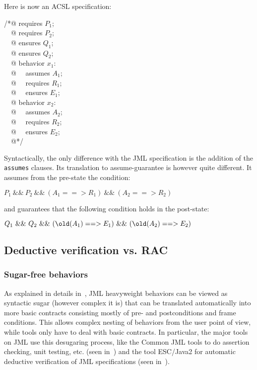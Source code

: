 \noindent
Here is now an ACSL specification:

\begin{flushleft}\ttfamily
/*@ requires $P_1$; \\
~~@ requires $P_2$; \\
~~@ ensures  $Q_1$; \\
~~@ ensures  $Q_2$; \\
~~@ behavior $x_1$: \\
~~@ ~~assumes $A_1$; \\
~~@ ~~requires $R_1$; \\
~~@ ~~ensures $E_1$; \\
~~@ behavior $x_2$: \\
~~@ ~~assumes $A_2$; \\
~~@ ~~requires $R_2$; \\
~~@ ~~ensures $E_2$; \\
~~@*/
\end{flushleft}

\noindent
Syntactically, the only difference with the JML specification is the
addition of the \verb|assumes| clauses.
Its translation to assume-guarantee is however quite different. 
It assumes from the pre-state the condition:

\begin{center}
{\ttfamily $P_1 ~\&\&~ P_2 ~\&\&~ 
  (A_1 ==> R_1) ~\&\&~ (A_2 ==> R_2)$}
\end{center}

\noindent
and guarantees that the following condition holds in the post-state:

\begin{center}
{\ttfamily $Q_1 ~\&\&~ Q_2 ~\&\&~ 
  (\texttt{{\textbackslash}old}(A_1) ==> E_1) ~\&\&~ (\texttt{{\textbackslash}old}(A_2) ==> E_2)$}
\end{center}

\subsection{Deductive verification vs. RAC}

\subsubsection*{Sugar-free behaviors}

As explained in details in~\cite{raghavan00desugaring}, JML
heavyweight behaviors can be viewed as syntactic sugar (however
complex it is) that can be translated automatically into more basic
contracts consisting mostly of pre- and postconditions and frame
conditions.  This allows complex nesting of behaviors from the user
point of view, while tools only have to deal with basic contracts. In
particular, the major tools on JML use this desugaring process, like
the Common JML tools to do assertion checking, unit testing,
etc. (seen in~\cite{leavens00jml}) and the tool ESC/Java2 for
automatic deductive verification of JML specifications (seen
in~\cite{kiriny07implnotes}).

